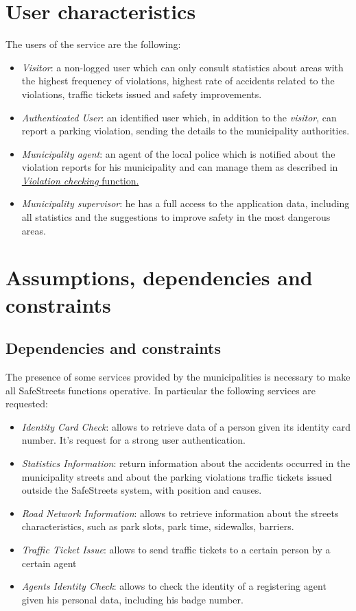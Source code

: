 \documentclass[a4paper]{report}
\begin{document}
\section{User characteristics}
The users of the service are the following:
\begin{itemize}
\item \textit{Visitor}: a non-logged user which can only consult statistics about areas with the highest frequency of violations, highest rate of accidents related to the violations, traffic tickets issued and safety improvements. 
\item \textit{Authenticated User}: an identified user which, in addition to the \textit{visitor}, can report a parking violation, sending the details to the municipality authorities.
\item \textit{Municipality agent}: an agent of the local police which is notified about the violation reports for his municipality and can manage them as described in \hyperref[sub-agentfun]{\textit{Violation checking} function.}
\item \textit{Municipality supervisor}: he has a full access to the application data, including all statistics and the suggestions to improve safety in the most dangerous areas.
\end{itemize}
\section{Assumptions, dependencies and constraints}
\subsection{Dependencies and constraints}
\label{SS-Dep&Const} 
The presence of some services provided by the municipalities is necessary to make all SafeStreets functions operative. In particular the following services are requested:
\begin{itemize}
\item \textit{Identity Card Check}: allows to retrieve data of a person given its identity card number.  It's request for a strong user authentication.
\item \textit{Statistics Information}: return information about the accidents occurred in the municipality streets and about the parking violations traffic tickets issued outside the SafeStreets system, with position and causes.
\item \textit{Road Network Information}: allows to retrieve information about the streets characteristics, such as park slots, park time, sidewalks, barriers.
\item \textit{Traffic Ticket Issue}: allows to send traffic tickets to a certain person by a certain agent
\item \textit{Agents Identity Check}: allows to check the identity of a registering agent given his personal data, including his badge number. 
\end{itemize}
\end{document}
